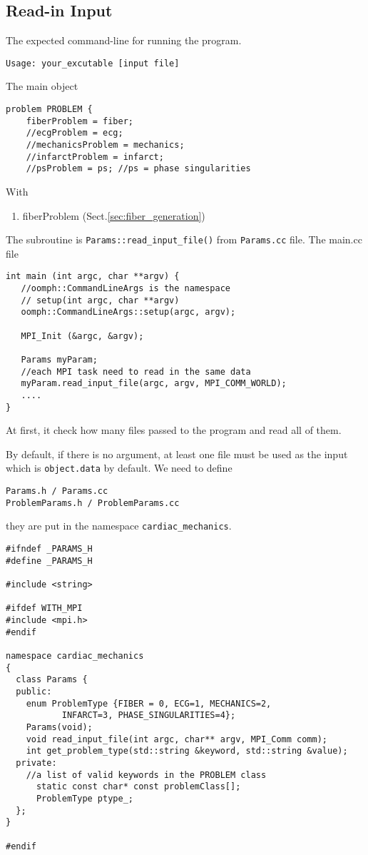 \subsection{Read-in Input}

The expected command-line for running the program.
{\small \begin{verbatim} 
Usage: your_excutable [input file]
\end{verbatim}}

The main object
\begin{verbatim}
problem PROBLEM {
	fiberProblem = fiber;
	//ecgProblem = ecg;
	//mechanicsProblem = mechanics;
	//infarctProblem = infarct;
	//psProblem = ps; //ps = phase singularities
\end{verbatim}
With
\begin{enumerate}
  \item fiberProblem (Sect.\ref{sec:fiber_generation})
\end{enumerate}

The subroutine is \verb!Params::read_input_file()! from \verb!Params.cc! file.
The main.cc file
\begin{verbatim}
int main (int argc, char **argv) {
   //oomph::CommandLineArgs is the namespace
   // setup(int argc, char **argv)
   oomph::CommandLineArgs::setup(argc, argv);
	
   MPI_Init (&argc, &argv);

   Params myParam;
   //each MPI task need to read in the same data
   myParam.read_input_file(argc, argv, MPI_COMM_WORLD);
   ....
}
\end{verbatim}


At first, it check how many
files passed to the program and read all of them.

By default, if there is no argument, at least one file must be used as the input
which is \verb!object.data! by default. We need to define 
\begin{verbatim}
Params.h / Params.cc
ProblemParams.h / ProblemParams.cc
\end{verbatim}
they are put in the namespace \verb!cardiac_mechanics!.
 {\small
\begin{verbatim}
#ifndef _PARAMS_H
#define _PARAMS_H

#include <string>

#ifdef WITH_MPI
#include <mpi.h>
#endif

namespace cardiac_mechanics
{
  class Params {
  public:
    enum ProblemType {FIBER = 0, ECG=1, MECHANICS=2, 
           INFARCT=3, PHASE_SINGULARITIES=4};
    Params(void);
    void read_input_file(int argc, char** argv, MPI_Comm comm);
    int get_problem_type(std::string &keyword, std::string &value);
  private:
    //a list of valid keywords in the PROBLEM class
      static const char* const problemClass[];
      ProblemType ptype_;
  }; 
}
   
#endif
\end{verbatim}
}

